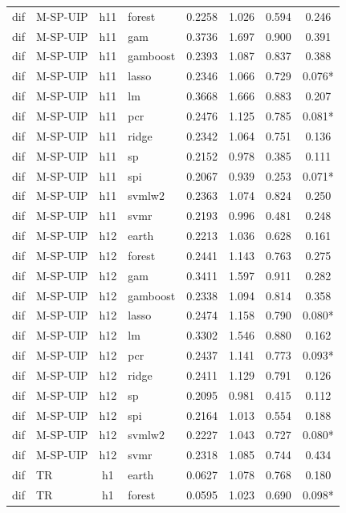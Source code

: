 \begin{ThreePartTable}
\begin{longtable}[t]{llclcccc}
dif & M-SP-UIP & h11 & forest & 0.2258 & 1.026 & 0.594 & 0.246\\
dif & M-SP-UIP & h11 & gam & 0.3736 & 1.697 & 0.900 & 0.391\\
dif & M-SP-UIP & h11 & gamboost & 0.2393 & 1.087 & 0.837 & 0.388\\
dif & M-SP-UIP & h11 & lasso & 0.2346 & 1.066 & 0.729 & 0.076*\\
dif & M-SP-UIP & h11 & lm & 0.3668 & 1.666 & 0.883 & 0.207\\
dif & M-SP-UIP & h11 & pcr & 0.2476 & 1.125 & 0.785 & 0.081*\\
dif & M-SP-UIP & h11 & ridge & 0.2342 & 1.064 & 0.751 & 0.136\\
dif & M-SP-UIP & h11 & sp & 0.2152 & 0.978 & 0.385 & 0.111\\
dif & M-SP-UIP & h11 & spi & 0.2067 & 0.939 & 0.253 & 0.071*\\
dif & M-SP-UIP & h11 & svmlw2 & 0.2363 & 1.074 & 0.824 & 0.250\\
dif & M-SP-UIP & h11 & svmr & 0.2193 & 0.996 & 0.481 & 0.248\\
\addlinespace
dif & M-SP-UIP & h12 & earth & 0.2213 & 1.036 & 0.628 & 0.161\\
dif & M-SP-UIP & h12 & forest & 0.2441 & 1.143 & 0.763 & 0.275\\
dif & M-SP-UIP & h12 & gam & 0.3411 & 1.597 & 0.911 & 0.282\\
dif & M-SP-UIP & h12 & gamboost & 0.2338 & 1.094 & 0.814 & 0.358\\
dif & M-SP-UIP & h12 & lasso & 0.2474 & 1.158 & 0.790 & 0.080*\\
dif & M-SP-UIP & h12 & lm & 0.3302 & 1.546 & 0.880 & 0.162\\
dif & M-SP-UIP & h12 & pcr & 0.2437 & 1.141 & 0.773 & 0.093*\\
dif & M-SP-UIP & h12 & ridge & 0.2411 & 1.129 & 0.791 & 0.126\\
dif & M-SP-UIP & h12 & sp & 0.2095 & 0.981 & 0.415 & 0.112\\
dif & M-SP-UIP & h12 & spi & 0.2164 & 1.013 & 0.554 & 0.188\\
dif & M-SP-UIP & h12 & svmlw2 & 0.2227 & 1.043 & 0.727 & 0.080*\\
dif & M-SP-UIP & h12 & svmr & 0.2318 & 1.085 & 0.744 & 0.434\\
\addlinespace
dif & TR & h1 & earth & 0.0627 & 1.078 & 0.768 & 0.180\\
dif & TR & h1 & forest & 0.0595 & 1.023 & 0.690 & 0.098*\\

\end{longtable}
\end{ThreePartTable}

